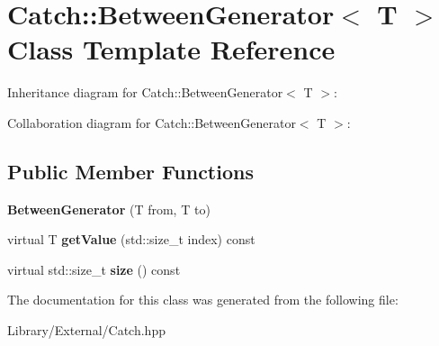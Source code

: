 \hypertarget{class_catch_1_1_between_generator}{}\section{Catch\+:\+:Between\+Generator$<$ T $>$ Class Template Reference}
\label{class_catch_1_1_between_generator}


Inheritance diagram for Catch\+:\+:Between\+Generator$<$ T $>$\+:


Collaboration diagram for Catch\+:\+:Between\+Generator$<$ T $>$\+:
\subsection*{Public Member Functions}
\begin{DoxyCompactItemize}
\item 
\hypertarget{class_catch_1_1_between_generator_a835a057d691ae37caef660624099b51c}{}{\bfseries Between\+Generator} (T from, T to)\label{class_catch_1_1_between_generator_a835a057d691ae37caef660624099b51c}

\item 
\hypertarget{class_catch_1_1_between_generator_af83575d62cc727ca995446cff4d6c26c}{}virtual T {\bfseries get\+Value} (std\+::size\+\_\+t index) const \label{class_catch_1_1_between_generator_af83575d62cc727ca995446cff4d6c26c}

\item 
\hypertarget{class_catch_1_1_between_generator_aa53a04a259e796ba2b5adabed79474b5}{}virtual std\+::size\+\_\+t {\bfseries size} () const \label{class_catch_1_1_between_generator_aa53a04a259e796ba2b5adabed79474b5}

\end{DoxyCompactItemize}


The documentation for this class was generated from the following file\+:\begin{DoxyCompactItemize}
\item 
Library/\+External/Catch.\+hpp\end{DoxyCompactItemize}
